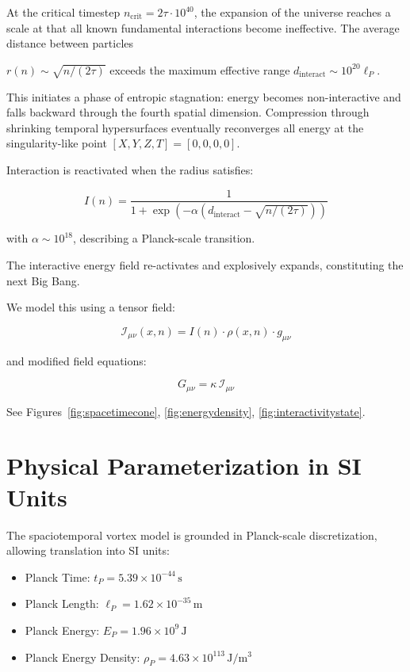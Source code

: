 \documentclass[11pt]{article}
\begin{document}
At the critical timestep \( n_{\mathrm{crit}} = 2\tau \cdot 10^{40} \), the expansion of the universe reaches a scale 
at that all known fundamental interactions become ineffective. The average distance between particles 

\( r(n) \sim \sqrt{n / (2\tau)} \) exceeds the maximum effective range \( d_{\mathrm{interact}} \sim 10^{20} \ell_P \).


This initiates a phase of entropic stagnation: energy becomes non-interactive and falls backward 
through the fourth spatial dimension. Compression through shrinking temporal hypersurfaces eventually reconverges 
all energy at the singularity-like point \([X,Y,Z,T] = [0,0,0,0]\).


Interaction is reactivated when the radius satisfies:

\begin{equation*}
I(n) = \frac{1}{1 + \exp\left(-\alpha (d_{\mathrm{interact}} - \sqrt{n / (2\tau)})\right)}
\end{equation*}

with \( \alpha \sim 10^{18} \), describing a Planck-scale transition.

The interactive energy field re-activates and explosively expands, constituting the next Big Bang. 

We model this using a tensor field:

\begin{equation*}
\mathcal{I}_{\mu\nu}(x,n) = I(n) \cdot \rho(x,n) \cdot g_{\mu\nu}
\end{equation*}

and modified field equations:

\begin{equation*}
G_{\mu\nu} = \kappa \, \mathcal{I}_{\mu\nu}
\end{equation*}

See Figures~\ref{fig:spacetimecone}, \ref{fig:energydensity}, \ref{fig:interactivitystate}.

\section{Physical Parameterization in SI Units}

The spaciotemporal vortex model is grounded in Planck-scale discretization, allowing translation into SI units:

\begin{itemize}
  \item Planck Time: $t_P = 5.39 \times 10^{-44} \, \mathrm{s}$
  \item Planck Length: $\ell_P = 1.62 \times 10^{-35} \, \mathrm{m}$
  \item Planck Energy: $E_P = 1.96 \times 10^{9} \, \mathrm{J}$
  \item Planck Energy Density: $\rho_P = 4.63 \times 10^{113} \, \mathrm{J/m^3}$
\end{itemize}
\end{document}
